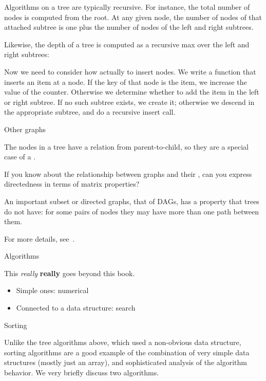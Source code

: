Algorithms on a tree are typically recursive. For instance, the total
number of nodes is computed from the root. At any given node, the
number of nodes of that attached subtree is one plus the number of
nodes of the left and right subtrees.
%

Likewise, the depth of a tree is computed as a recursive max over the
left and right subtrees:
%

Now we need to consider how actually to insert nodes. We write a
function that inserts an item at a node. If the key of that node is
the item, we increase the value of the counter. Otherwise we determine
whether to add the item in the left or right subtree. If no such
subtree exists, we create it; otherwise we descend in the appropriate
subtree, and do a recursive insert call.
%


 {Other graphs}

The nodes in a tree have a relation from parent-to-child, so
they are a special case of a .

\begin{exercise}
  If you know about the relationship between graphs and their
  ,
  can you express directedness in terms of matrix properties?
\end{exercise}

An important subset or directed graphs, that of \acp{DAG},
has a property that trees do not have:
for some pairs of nodes they may have more than one
path between them.

For more details, see~.

 {Algorithms}

This \emph{really} \textbf{really} goes beyond this book.

\begin{itemize}
\item Simple ones: numerical
\item Connected to a data structure: search
\end{itemize}

 {Sorting}

Unlike the tree algorithms above, which used a non-obvious data
structure,
sorting algorithms are a good example of the combination of very
simple data structures (mostly just an array), and sophisticated
analysis of the algorithm behavior. We very briefly discuss two
algorithms.

